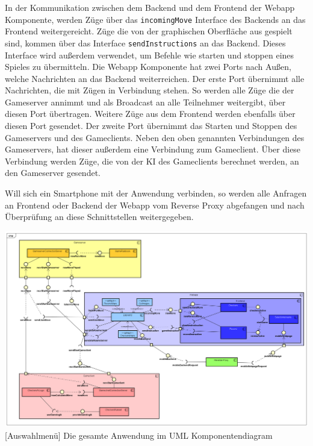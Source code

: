 \documentclass[12pt,a4paper,bibliography=totocnumbered,listof=totocnumbered]{article}
\begin{document}
In der Kommunikation zwischen dem Backend und dem Frontend der Webapp Komponente, werden Züge über das \texttt{incomingMove} Interface des Backends an das Frontend
weitergereicht. Züge die von der graphischen Oberfläche aus gespielt sind, kommen über das Interface \texttt{sendInstructions} an das Backend. Dieses
Interface wird außerdem verwendet, um Befehle wie starten und stoppen eines Spieles zu übermitteln. Die Webapp Komponente hat zwei Ports nach Außen, 
welche Nachrichten an das Backend
weiterreichen. Der erste Port übernimmt alle Nachrichten, die mit Zügen in Verbindung stehen. So werden alle Züge die der Gameserver annimmt
und als Broadcast an alle Teilnehmer weitergibt, über diesen Port übertragen. Weitere Züge aus dem Frontend werden ebenfalls über diesen Port gesendet.
Der zweite Port übernimmt das Starten und Stoppen des Gameservers und des Gameclients. 
Neben den oben genannten Verbindungen des Gameservers, hat dieser außerdem eine Verbindung zum Gameclient. Über diese Verbindung werden Züge, die von der 
KI des Gameclients berechnet werden, an den Gameserver gesendet.

Will sich ein Smartphone mit der Anwendung verbinden, so werden alle Anfragen an Frontend oder Backend der Webapp vom Reverse Proxy abgefangen und 
nach Überprüfung an diese Schnittstellen weitergegeben.


\vspace{1em}
\begin{minipage}{\linewidth}
	\centering
	\includegraphics[width=1.0\linewidth]{pics/Komponentendiagram.png}
	[Auswahlmenü]{ Die gesamte Anwendung im UML Komponentendiagram}
	\label{fig:ComponentDiagram}
\end{minipage}
\end{document}

